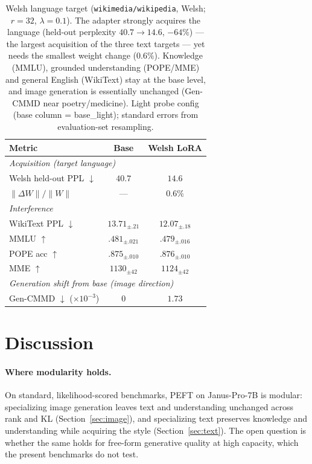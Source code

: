 \documentclass{article}
\begin{document}
\begin{table}[t]
\centering\small
\setlength{\tabcolsep}{12pt}
\begin{tabular}{lcc}
\toprule
\textbf{Metric} & \textbf{Base} & \textbf{Welsh LoRA} \\
\midrule
\multicolumn{3}{l}{\textit{Acquisition (target language)}}\\
Welsh held-out PPL $\downarrow$ & $40.7$ & $\mathbf{14.6}$ \\
$\lVert\Delta W\rVert/\lVert W\rVert$ & --- & $0.6\%$ \\
\midrule
\multicolumn{3}{l}{\textit{Interference}}\\
WikiText PPL $\downarrow$ & $13.71_{\pm.21}$ & $12.07_{\pm.18}$ \\
MMLU $\uparrow$           & $.481_{\pm.021}$  & $.479_{\pm.016}$ \\
POPE acc $\uparrow$       & $.875_{\pm.010}$  & $.876_{\pm.010}$ \\
MME $\uparrow$            & $1130_{\pm42}$  & $1124_{\pm42}$ \\\midrule
\multicolumn{3}{l}{\textit{Generation shift from base (image direction)}}\\
Gen-CMMD $\downarrow$ ($\times10^{-3}$) & $0$ & $1.73$ \\
\bottomrule
\end{tabular}
\caption{Welsh language target (\texttt{wikimedia/wikipedia}, Welsh; $r{=}32$,
$\lambda{=}0.1$). The adapter strongly acquires the language (held-out perplexity
$40.7\!\to\!14.6$, $-64\%$) --- the largest acquisition of the three text
targets --- yet needs the smallest weight change ($0.6\%$). Knowledge (MMLU),
grounded understanding (POPE/MME) and general English (WikiText) stay at the base
level, and image generation is essentially unchanged (Gen-CMMD near
poetry/medicine). Light probe config (base column = base\_light); standard
errors from evaluation-set resampling.}
\label{tab:welsh}
\end{table}

\section{Discussion}
\paragraph{Where modularity holds.}
On standard, likelihood-scored benchmarks, PEFT on Janus-Pro-7B is modular:
specializing image generation leaves text and understanding unchanged across rank
and KL (Section~\ref{sec:image}), and specializing text preserves knowledge and
understanding while acquiring the style (Section~\ref{sec:text}). The open
question is whether the same holds for free-form generative quality at high
capacity, which the present benchmarks do not test.
\end{document}
